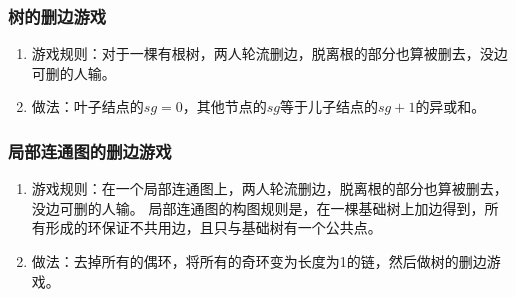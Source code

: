 	\subsubsection{树的删边游戏}
		\begin{enumerate}
			\item
				游戏规则：对于一棵有根树，两人轮流删边，脱离根的部分也算被删去，没边可删的人输。
			\item
				做法：叶子结点的$sg=0$，其他节点的$sg$等于儿子结点的$sg+1$的异或和。
		\end{enumerate}
	\subsubsection{局部连通图的删边游戏}
		\begin{enumerate}
			\item
				游戏规则：在一个局部连通图上，两人轮流删边，脱离根的部分也算被删去，没边可删的人输。
				局部连通图的构图规则是，在一棵基础树上加边得到，所有形成的环保证不共用边，且只与基础树有一个公共点。
			\item
				做法：去掉所有的偶环，将所有的奇环变为长度为1的链，然后做树的删边游戏。
		\end{enumerate}
